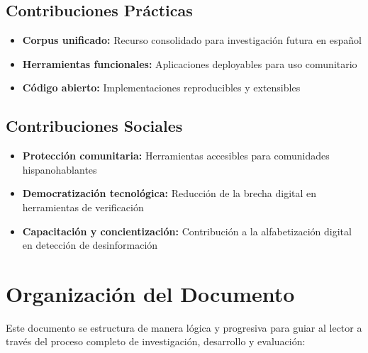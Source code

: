 \subsection{Contribuciones Prácticas}
\begin{itemize}
    \item \textbf{Corpus unificado:} Recurso consolidado para investigación futura en español
    \item \textbf{Herramientas funcionales:} Aplicaciones deployables para uso comunitario
    \item \textbf{Código abierto:} Implementaciones reproducibles y extensibles
\end{itemize}

\subsection{Contribuciones Sociales}
\begin{itemize}
    \item \textbf{Protección comunitaria:} Herramientas accesibles para comunidades hispanohablantes
    \item \textbf{Democratización tecnológica:} Reducción de la brecha digital en herramientas de verificación
    \item \textbf{Capacitación y concientización:} Contribución a la alfabetización digital en detección de desinformación
\end{itemize}

\section{Organización del Documento}

Este documento se estructura de manera lógica y progresiva para guiar al lector a través del proceso completo de investigación, desarrollo y evaluación:

